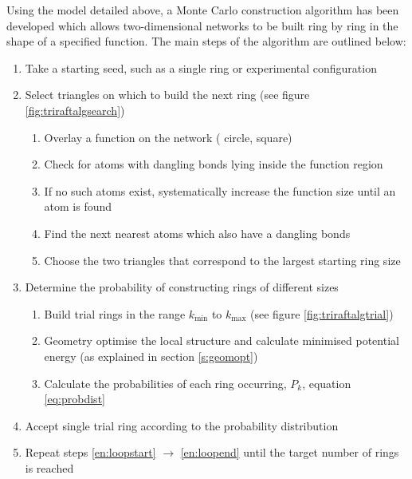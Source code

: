 Using the model detailed above, a Monte Carlo construction algorithm has been developed which allows two\--dimensional networks to be built ring by ring in the shape of a specified function. The main steps of the algorithm are outlined below:
\begin{enumerate}
	\item Take a starting seed, such as a single ring or experimental configuration
	\item Select triangles on which to build the next ring (see figure \ref{fig:triraftalgsearch})
		\label{en:loopstart}
		\begin{enumerate}
			\item Overlay a function on the network (\eg{} circle, square)
			\item Check for atoms with dangling bonds lying inside the function region
			\item If no such atoms exist, systematically increase the function size until an atom is found
			\item Find the next nearest atoms which also have a dangling bonds
			\item Choose the two triangles that correspond to the largest starting ring size	
		\end{enumerate}
	\item Determine the probability of constructing rings of different sizes
		\begin{enumerate}
			\item Build trial rings in the range $k_{\text{min}}$ to $k_{\text{max}}$ (see figure \ref{fig:triraftalgtrial})
			\item Geometry optimise the local structure and calculate minimised potential energy (as explained in section \ref{s:geomopt})
			\item Calculate the probabilities of each ring occurring, $P_k$, equation \eqref{eq:probdist}
		\end{enumerate}
	\item Accept single trial ring according to the probability distribution
		\label{en:loopend}
	\item Repeat steps \ref{en:loopstart} $\rightarrow$ \ref{en:loopend} until the target number of rings is reached
\end{enumerate}

